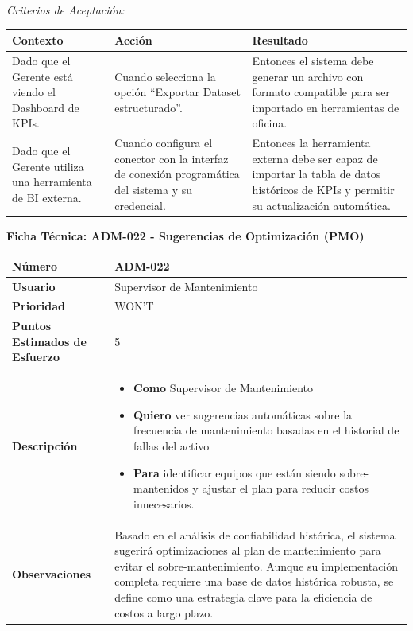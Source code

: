 \noindent\textit{Criterios de Aceptación:}
\footnotesize\begin{longtable}{|p{0.28\textwidth}|p{0.32\textwidth}|p{0.34\textwidth}|}\hline
\textbf{Contexto} & \textbf{Acción} & \textbf{Resultado} \\ \hline
\parbox[t]{\linewidth}{Dado que el Gerente está viendo el Dashboard de KPIs.} & \parbox[t]{\linewidth}{Cuando selecciona la opción ``Exportar Dataset estructurado''.} & \parbox[t]{\linewidth}{Entonces el sistema debe generar un archivo con formato compatible para ser importado en herramientas de oficina.} \\ \hline
\parbox[t]{\linewidth}{Dado que el Gerente utiliza una herramienta de BI externa.} & \parbox[t]{\linewidth}{Cuando configura el conector con la interfaz de conexión programática del sistema y su credencial.} & \parbox[t]{\linewidth}{Entonces la herramienta externa debe ser capaz de importar la tabla de datos históricos de KPIs y permitir su actualización automática.} \\ \hline
\end{longtable}\normalsize
\vspace{1em}
\noindent\textbf{Ficha Técnica: ADM-022 - Sugerencias de Optimización (PMO)}
\footnotesize\setlength{\tabcolsep}{4pt}\renewcommand{\arraystretch}{1.2}
\begin{longtable}{|p{0.21\textwidth}|p{0.74\textwidth}|}\hline
\textbf{Número} & ADM-022 \\ \hline
\textbf{Usuario} & Supervisor de Mantenimiento \\ \hline
\textbf{Prioridad} & WON'T \\ \hline
\textbf{Puntos Estimados de Esfuerzo} & 5 \\ \hline
\textbf{Descripción} & \parbox[t]{\linewidth}{\vspace{2pt}\begin{itemize}[leftmargin=1.5em, nosep, topsep=0pt]
\item \textbf{Como} Supervisor de Mantenimiento
\item \textbf{Quiero} ver sugerencias automáticas sobre la frecuencia de mantenimiento basadas en el historial de fallas del activo
\item \textbf{Para} identificar equipos que están siendo sobre-mantenidos y ajustar el plan para reducir costos innecesarios.
\end{itemize}\vspace{2pt}} \\ \hline
\textbf{Observaciones} & Basado en el análisis de confiabilidad histórica, el sistema sugerirá optimizaciones al plan de mantenimiento para evitar el sobre-mantenimiento. Aunque su implementación completa requiere una base de datos histórica robusta, se define como una estrategia clave para la eficiencia de costos a largo plazo. \\ \hline
\end{longtable}\normalsize
